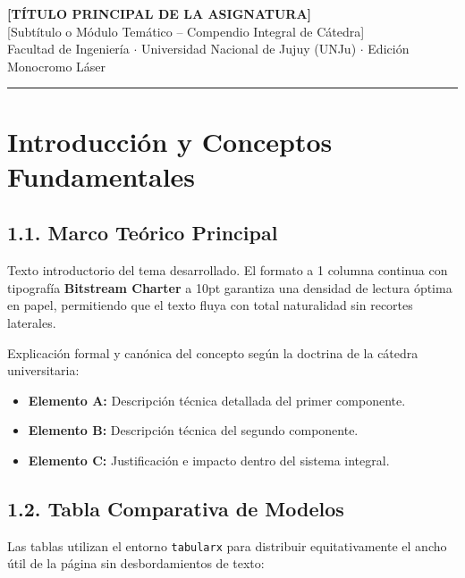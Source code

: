 \documentclass[10pt,a4paper,twoside]{extarticle}
\begin{document}
\thispagestyle{firstpage}

\noindent
{\fontsize{16pt}{20pt}\selectfont\sffamily\bfseries [TÍTULO PRINCIPAL DE LA ASIGNATURA]}\\[3pt]
{\fontsize{10.5pt}{13.5pt}\selectfont\sffamily\color{black!80} [Subtítulo o Módulo Temático -- Compendio Integral de Cátedra]}\\[2pt]
{\fontsize{8.5pt}{11pt}\selectfont\color{black!65} Facultad de Ingeniería $\cdot$ Universidad Nacional de Jujuy (UNJu) $\cdot$ Edición Monocromo Láser}\\[4pt]
\rule{\textwidth}{0.8pt}
\vspace{2mm}

\section{Introducción y Conceptos Fundamentales}

\subsection{1.1. Marco Teórico Principal}
Texto introductorio del tema desarrollado. El formato a 1 columna continua con tipografía \textbf{Bitstream Charter} a 10pt garantiza una densidad de lectura óptima en papel, permitiendo que el texto fluya con total naturalidad sin recortes laterales.

\begin{definicion}
Explicación formal y canónica del concepto según la doctrina de la cátedra universitaria:
\begin{itemize}
    \item \textbf{Elemento A:} Descripción técnica detallada del primer componente.
    \item \textbf{Elemento B:} Descripción técnica del segundo componente.
    \item \textbf{Elemento C:} Justificación e impacto dentro del sistema integral.
\end{itemize}
\end{definicion}

\subsection{1.2. Tabla Comparativa de Modelos}
Las tablas utilizan el entorno \texttt{tabularx} para distribuir equitativamente el ancho útil de la página sin desbordamientos de texto:
\end{document}

